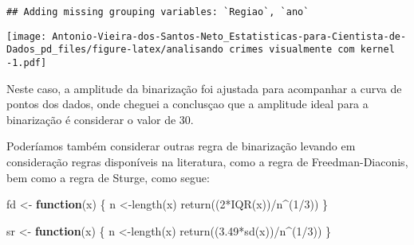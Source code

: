 \documentclass[
]{article}
\newenvironment{Shaded}{\begin{snugshade}}{\end{snugshade}}
\newcommand{\ControlFlowTok}[1]{\textcolor[rgb]{0.13,0.29,0.53}{\textbf{#1}}}
\newcommand{\DecValTok}[1]{\textcolor[rgb]{0.00,0.00,0.81}{#1}}
\newcommand{\FloatTok}[1]{\textcolor[rgb]{0.00,0.00,0.81}{#1}}
\newcommand{\FunctionTok}[1]{\textcolor[rgb]{0.00,0.00,0.00}{#1}}
\newcommand{\NormalTok}[1]{#1}
\newcommand{\OtherTok}[1]{\textcolor[rgb]{0.56,0.35,0.01}{#1}}
\newcommand{\SpecialCharTok}[1]{\textcolor[rgb]{0.00,0.00,0.00}{#1}}
\begin{document}
\begin{verbatim}
## Adding missing grouping variables: `Regiao`, `ano`
\end{verbatim}

\texttt{[image: Antonio-Vieira-dos-Santos-Neto\_Estatisticas-para-Cientista-de-Dados\_pd\_files/figure-latex/analisando crimes visualmente com kernel -1.pdf]}

Neste caso, a amplitude da binarização foi ajustada para acompanhar a curva de pontos dos dados, onde cheguei a conclusçao que a amplitude ideal para a binarização é considerar o valor de 30.

Poderíamos também considerar outras regra de binarização levando em consideração regras disponíveis na literatura, como a regra de Freedman-Diaconis, bem como a regra de Sturge, como segue:

\begin{Shaded}
\begin{Highlighting}[]
\NormalTok{fd }\OtherTok{\textless{}{-}} \ControlFlowTok{function}\NormalTok{(x) \{}
\NormalTok{  n }\OtherTok{\textless{}{-}}\FunctionTok{length}\NormalTok{(x)}
  \FunctionTok{return}\NormalTok{((}\DecValTok{2}\SpecialCharTok{*}\FunctionTok{IQR}\NormalTok{(x))}\SpecialCharTok{/}\NormalTok{n}\SpecialCharTok{\^{}}\NormalTok{(}\DecValTok{1}\SpecialCharTok{/}\DecValTok{3}\NormalTok{))}
\NormalTok{\}}


\NormalTok{sr }\OtherTok{\textless{}{-}} \ControlFlowTok{function}\NormalTok{(x) \{}
\NormalTok{  n }\OtherTok{\textless{}{-}}\FunctionTok{length}\NormalTok{(x)}
  \FunctionTok{return}\NormalTok{((}\FloatTok{3.49}\SpecialCharTok{*}\FunctionTok{sd}\NormalTok{(x))}\SpecialCharTok{/}\NormalTok{n}\SpecialCharTok{\^{}}\NormalTok{(}\DecValTok{1}\SpecialCharTok{/}\DecValTok{3}\NormalTok{))}
\NormalTok{\}}
\end{Highlighting}
\end{Shaded}
\end{document}
